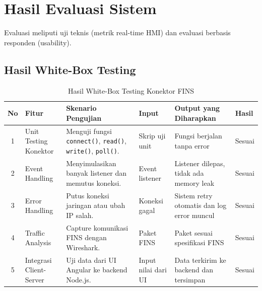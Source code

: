 \section{Hasil Evaluasi Sistem}
Evaluasi meliputi uji teknis (metrik real-time HMI) dan evaluasi berbasis responden (usability).
\subsection{Hasil White-Box Testing}
\begin{table}[H]
    \centering
    \begin{tabular}{|c|p{2.2cm}|p{3.7cm}|p{1.5cm}|p{2.5cm}|p{1.3cm}|}
        \hline
        \textbf{No} & \textbf{Fitur} & \textbf{Skenario Pengujian} & \textbf{Input} & \textbf{Output yang Diharapkan} & \textbf{Hasil} \\
        \hline
        1 & Unit Testing Konektor & Menguji fungsi \texttt{connect()}, \texttt{read()}, \texttt{write()}, \texttt{poll()}. & Skrip uji unit & Fungsi berjalan tanpa error & Sesuai \\ \hline
        2 & Event Handling & Menyimulasikan banyak listener dan memutus koneksi. & Event listener & Listener dilepas, tidak ada memory leak & Sesuai \\ \hline
        3 & Error Handling & Putus koneksi jaringan atau ubah IP salah. & Koneksi gagal & Sistem retry otomatis dan log error muncul & Sesuai \\ \hline
        4 & Traffic Analysis & Capture komunikasi FINS dengan Wireshark. & Paket FINS & Paket sesuai spesifikasi FINS & Sesuai \\ \hline
        5 & Integrasi Client-Server & Uji data dari UI Angular ke backend Node.js. & Input nilai dari UI & Data terkirim ke backend dan tersimpan & Sesuai \\ \hline
    \end{tabular}
    \caption{Hasil White-Box Testing Konektor FINS}
    \label{tab:whitebox-result}
\end{table}
